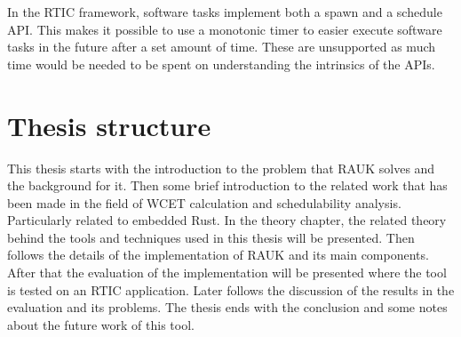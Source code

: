 In the RTIC framework, software tasks implement both a spawn and a schedule
API. This makes it possible to use a monotonic timer to easier execute software
tasks in the future after a set amount of time. These are unsupported as much
time would be needed to be spent on understanding the intrinsics of the APIs.

\section{Thesis structure}
This thesis starts with the introduction to the problem that RAUK solves and
the background for it. Then some brief introduction to the related work that
has been made in the field of WCET calculation and schedulability analysis.
Particularly related to embedded Rust. In the theory chapter, the related
theory behind the tools and techniques used in this thesis will be presented.
Then follows the details of the implementation of RAUK and its main components.
After that the evaluation of the implementation will be presented where the
tool is tested on an RTIC application. Later follows the discussion of the
results in the evaluation and its problems. The thesis ends with the conclusion
and some notes about the future work of this tool.

